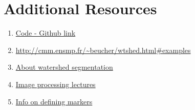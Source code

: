 \documentclass[]{article}
\providecommand{\tightlist}{%
  \setlength{\itemsep}{0pt}\setlength{\parskip}{0pt}}
\begin{document}
\newpage
\section{Additional Resources}\label{additional-resources}

\begin{enumerate}
\def\labelenumi{\arabic{enumi})}
\tightlist
\item \href{https://github.com/eyantrainternship/eYSIP_2015_Marker_based_Robot_Localisation/blob/master/Task-2/Watershed%20Segmentation/src/watershed.py}{Code - Github link}
\item \url{http://cmm.ensmp.fr/~beucher/wtshed.html\#examples}
\item \href{http://opencv-python-tutroals.readthedocs.org/en/latest/py
\_tutorials/py\_imgproc/py\_watershed/py\_watershed.html\#watershed}{About watershed segmentation}
\item \href{https://www.cs.auckland.ac.nz/courses/compsci773s1c/lectures
/ImageProcessing-html/topic3.htm}{Image processing lectures}
\item \href{http://stackoverflow.com/questions/11294859 \\ /how-to-define-the-markers-for-watershed-in-opencv}{Info on defining markers}
\end{enumerate}
\end{document}
